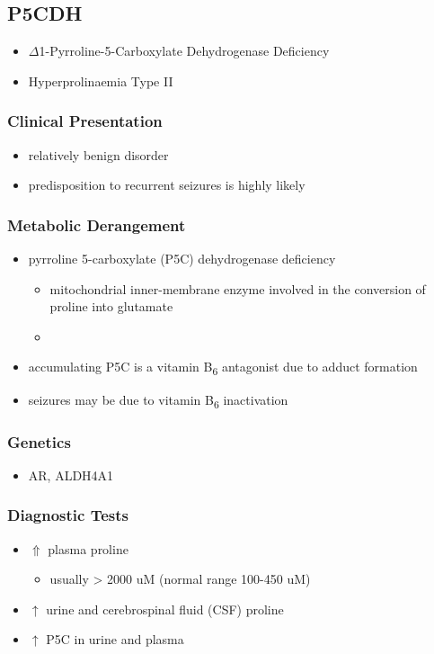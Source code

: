 \documentclass{scrartcl}
\begin{document}
\subsection{P5CDH}
\label{sec:org97aade5}
\begin{itemize}
\item \(\Delta\)1-Pyrroline-5-Carboxylate Dehydrogenase Deficiency
\item Hyperprolinaemia Type II
\end{itemize}
\subsubsection{Clinical Presentation}
\label{sec:org8924461}
\begin{itemize}
\item relatively benign disorder
\item predisposition to recurrent seizures is highly likely
\end{itemize}
\subsubsection{Metabolic Derangement}
\label{sec:orgd8a15e9}
\begin{itemize}
\item pyrroline 5-carboxylate (P5C) dehydrogenase deficiency
\begin{itemize}
\item mitochondrial inner-membrane enzyme involved in the conversion of
proline into glutamate
\item {}
\end{itemize}
\item accumulating P5C is a vitamin B\textsubscript{6} antagonist due to adduct
formation
\item seizures may be due to vitamin B\textsubscript{6} inactivation
\end{itemize}

\subsubsection{Genetics}
\label{sec:org7e0f12a}
\begin{itemize}
\item AR, ALDH4A1
\end{itemize}

\subsubsection{Diagnostic Tests}
\label{sec:org3e25197}
\begin{itemize}
\item \(\Uparrow\) plasma proline
\begin{itemize}
\item usually \textgreater{} 2000 uM (normal range 100-450 uM)
\end{itemize}
\item \(\uparrow\) urine and cerebrospinal fluid (CSF) proline
\item \(\uparrow\) P5C in urine and plasma
\end{itemize}
\end{document}
